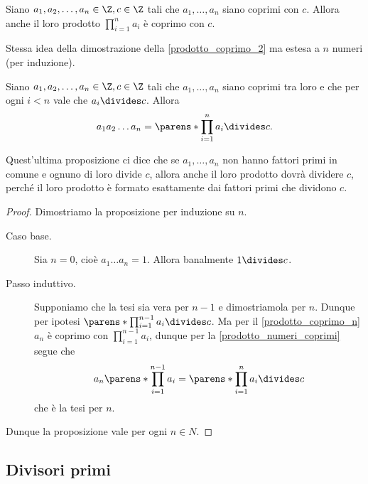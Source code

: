 \begin{corollary} \label{prodotto_coprimo_n}
    Siano $a_1, a_2, \dots, a_n \in \Z, c \in \Z$ tali che $a_1, \dots, a_n$ siano coprimi con $c$. Allora anche il loro prodotto $\prod_{i = 1}^{n} a_i$ è coprimo con $c$.
\end{corollary}
\begin{intuition}
    Stessa idea della dimostrazione della \autoref{prodotto_coprimo_2} ma estesa a $n$ numeri (per induzione).
\end{intuition}

\begin{proposition}
    Siano $a_1, a_2, \dots, a_n \in \Z, c \in \Z$ tali che $a_1, \dots, a_n$ siano coprimi tra loro e che per ogni $i<n$ vale che $a_i \divides c$.
    Allora \begin{equation}
        a_1a_2\dots a_n = \parens*{ \prod_{i = 1}^n a_i } \divides c.
    \end{equation}
\end{proposition}
\begin{intuition}
    Quest'ultima proposizione ci dice che se $a_1, \dots, a_n$ non hanno fattori primi in comune e ognuno di loro divide $c$, allora anche il loro prodotto dovrà dividere $c$, perché il loro prodotto è formato esattamente dai fattori primi che dividono $c$.
\end{intuition}
\begin{proof}
    Dimostriamo la proposizione per induzione su $n$.
    \begin{description}
        \item[Caso base.] 
        Sia $n = 0$, cioè $a_1\dots a_n = 1$. Allora banalmente $1 \divides c$.
        \item[Passo induttivo.]         
        Supponiamo che la tesi sia vera per $n-1$ e dimostriamola per $n$. Dunque per ipotesi $ \parens*{\prod_{i = 1}^{n - 1} a_i} \divides c$.
        Ma per il \autoref{prodotto_coprimo_n} $a_n$ è coprimo con $\prod_{i = 1}^{n - 1} a_i$, dunque per la \autoref{prodotto_numeri_coprimi} segue che
        \begin{equation*}
            a_n \parens*{\prod_{i = 1}^{n - 1} a_i} = \parens*{ \prod_{i = 1}^{n} a_i } \divides c
        \end{equation*}
        che è la tesi per $n$.
    \end{description}
    Dunque la proposizione vale per ogni $n \in N$.
\end{proof}

\subsection{Divisori primi}

